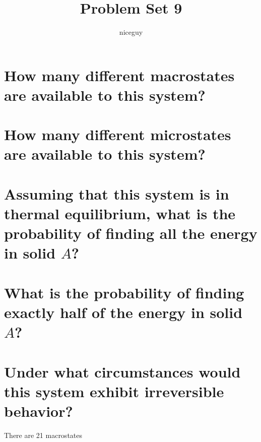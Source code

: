 \documentclass[answers]{exam}
\author{niceguy}
\title{Problem Set 9}
\begin{document}
\maketitle

\begin{questions}


\begin{parts}
	\part{How many different macrostates are available to this system?}
	\part{How many different microstates are available to this system?}
	\part{Assuming that this system is in thermal equilibrium, what is the probability of finding all the energy in solid $A$?}
	\part{What is the probability of finding exactly half of the energy in solid $A$?}
	\part{Under what circumstances would this system exhibit irreversible behavior?}
\end{parts}

\begin{solution}
	There are 21 macrostates
\end{solution}
\end{questions}
\end{document}
